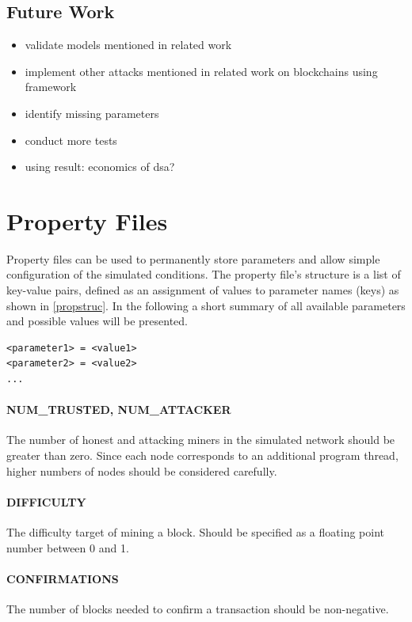 \documentclass[a4paper,12pt,twoside]{report}
\begin{document}
\section{Future Work}
\begin{itemize}
\item validate models mentioned in related work
\item implement other attacks mentioned in related work on blockchains using framework
\item identify missing parameters
\item conduct more tests
\item using result: economics of dsa?
\end{itemize}




\appendix

\chapter{Property Files} \label{prop}
Property files can be used to permanently store parameters and allow simple configuration of the simulated conditions. The property file's structure is a list of key-value pairs, defined as an assignment of values to parameter names (keys) as shown in \autoref{propstruc}. In the following a short summary of all available parameters and possible values will be presented.
\begin{lstlisting}[caption=Property file structure,label=propstruc]
<parameter1> = <value1>
<parameter2> = <value2>
...
\end{lstlisting}
\subsubsection{NUM\_TRUSTED, NUM\_ATTACKER}
The number of honest and attacking miners in the simulated network should be greater than zero. Since each node corresponds to an additional program thread, higher numbers of nodes should be considered carefully.
\subsubsection{DIFFICULTY}
The difficulty target of mining a block. Should be specified as a floating point number between 0 and 1.
\subsubsection{CONFIRMATIONS}
The number of blocks needed to confirm a transaction should be non-negative.
\end{document}
